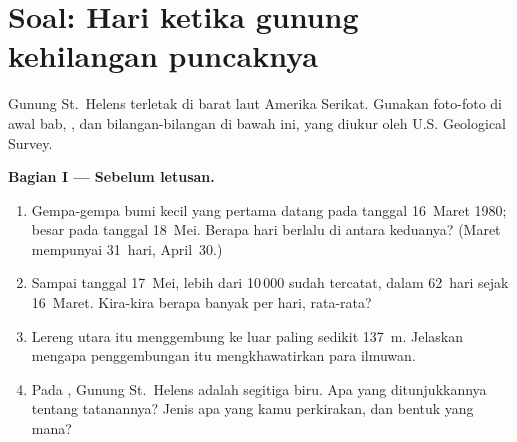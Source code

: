 \section{Soal: Hari ketika gunung kehilangan puncaknya}

\begin{problem}
\label{pb:g7:volcanoes:1}

Gunung St.~Helens terletak di barat laut Amerika Serikat. Gunakan foto-foto
di awal bab,  , dan bilangan-bilangan di bawah ini, yang
diukur oleh U.S. Geological Survey.

\medskip
\noindent\textbf{Bagian I --- Sebelum letusan.}
\begin{enumerate}
  \item Gempa-gempa bumi kecil yang pertama datang pada tanggal 16~Maret
        1980;  besar pada tanggal 18~Mei. Berapa hari berlalu di
        antara keduanya? (Maret mempunyai 31~hari, April~30.)
  \item Sampai tanggal 17~Mei, lebih dari 10\,000  sudah
        tercatat, dalam 62~hari sejak 16~Maret. Kira-kira berapa banyak per
        hari, rata-rata?
  \item Lereng utara  itu menggembung ke luar paling sedikit
        \qty{137}{m}. Jelaskan mengapa penggembungan itu mengkhawatirkan
        para ilmuwan.
  \item Pada  , Gunung St.~Helens adalah segitiga biru. Apa
        yang ditunjukkannya tentang tatanannya? Jenis  apa yang kamu
        perkirakan, dan bentuk  yang mana?
\end{enumerate}


\end{problem}
